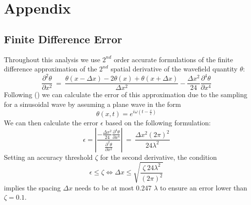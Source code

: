 \documentclass{article}
\begin{document}
	
	\singlespacing
	\begin{multicols}{2}[\printbibheading]
	\printbibliography[heading=none]
	\end{multicols}

	\doublespacing
	\newpage
	
	\appendix
	
	\section*{Appendix} 
	\renewcommand{\thesubsection}{\Alph{subsection}}
	\subsection{Finite Difference Error}\label{sec:Appendix}
	\renewcommand{\theequation}{A\thesection\arabic{equation}}
	\setcounter{equation}{0}
	\renewcommand{\thefigure}{A\arabic{figure}}
	\setcounter{figure}{0} 
	
	Throughout this analysis we use $2^{nd}$ order accurate formulations of the finite difference approximation of the $2^{nd}$ spatial derivative of the wavefield quantity $\theta$:
	\begin{equation}
		\frac{\partial^{2} \theta}{\partial x^{2}} \: = \: \frac{\theta(x-\Delta x) - 2 \theta(x) + \theta(x+ \Delta x)}{\Delta x^{2}} -  \frac{\Delta x^{2}}{24} \frac{\partial^{4} \theta}{\partial x^{4}}
	\end{equation}
	Following (\cite{Langston1}) we can calculate the error of this approximation due to the sampling for a sinusoidal wave by assuming a plane wave in the form
	\begin{equation}
		\theta(x,t) = e^{i \omega (t-\frac{x}{c})}
	\end{equation}
	We can then calculate the error $\epsilon$ based on the following formulation:
	\begin{equation}
		\epsilon = \left| \frac{-\frac{\Delta x^{2}}{24} \frac{\partial^{4} \theta}{\partial x^{4}}}{\frac{\partial^{2} \theta}{\partial x^{2}}} \right| \: = \: \frac{\Delta x^{2} (2 \pi)^{2}}{24 \lambda^{2}}
	\end{equation}
	Setting an accuracy threshold $\zeta$ for the second derivative, the condition
	\begin{equation}
		\epsilon \le \zeta \Leftrightarrow \Delta x \le \sqrt{\frac{\zeta \: 24 \lambda^{2}}{(2 \pi)^{2}}}
	\end{equation}
	implies the spacing $\Delta x$ needs to be at most 0.247 $\lambda$ to ensure an error lower than $\zeta=0.1$.
	
\end{document}
